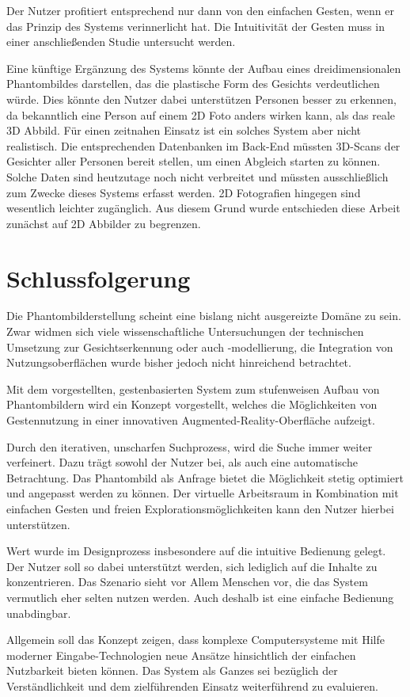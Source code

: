 \documentclass{sigchi-ext}
\begin{document}
Der Nutzer profitiert entsprechend nur dann von den einfachen Gesten, wenn er das Prinzip des Systems verinnerlicht hat. Die Intuitivität der Gesten muss in einer anschließenden Studie untersucht werden.

Eine künftige Ergänzung des Systems könnte der Aufbau eines dreidimensionalen Phantombildes 
darstellen, das die plastische Form des Gesichts verdeutlichen würde. Dies könnte den Nutzer dabei unterstützen Personen besser zu erkennen, da bekanntlich eine Person auf einem 2D Foto anders wirken kann, als das reale 3D Abbild. 
Für einen zeitnahen Einsatz ist ein solches System aber nicht realistisch. Die entsprechenden Datenbanken im Back-End müssten 3D-Scans der Gesichter aller Personen bereit stellen, um einen Abgleich starten zu können. Solche Daten sind heutzutage noch nicht verbreitet und müssten ausschließlich zum Zwecke dieses Systems erfasst werden. 2D Fotografien hingegen sind wesentlich leichter zugänglich. Aus diesem Grund wurde entschieden diese Arbeit zunächst auf 2D Abbilder zu begrenzen.

\section{Schlussfolgerung}
Die Phantombilderstellung scheint eine bislang nicht ausgereizte
Domäne zu sein. Zwar widmen sich viele wissenschaftliche
Untersuchungen der technischen Umsetzung zur Gesichtserkennung oder auch -modellierung, die Integration von Nutzungsoberflächen wurde bisher jedoch nicht hinreichend betrachtet.

Mit dem vorgestellten, gestenbasierten System zum stufenweisen Aufbau von
Phantombildern wird ein Konzept vorgestellt, welches die Möglichkeiten
von Gestennutzung in einer innovativen Augmented-Reality-Oberfläche
aufzeigt.

Durch den iterativen, unscharfen Suchprozess, wird die Suche immer weiter verfeinert.
Dazu trägt sowohl der Nutzer bei, als auch eine automatische Betrachtung. Das Phantombild als Anfrage bietet die Möglichkeit stetig optimiert und angepasst werden zu können. Der
virtuelle Arbeitsraum in Kombination mit einfachen Gesten und freien Explorationsmöglichkeiten kann den Nutzer hierbei unterstützen.

Wert wurde im Designprozess insbesondere auf die intuitive Bedienung gelegt. Der Nutzer soll so dabei unterstützt werden, sich lediglich auf die Inhalte zu konzentrieren. Das Szenario sieht vor Allem Menschen vor, die das System vermutlich eher selten nutzen werden. Auch deshalb ist eine einfache Bedienung unabdingbar.
 
Allgemein soll das Konzept zeigen, dass komplexe Computersysteme mit Hilfe moderner Eingabe-Technologien neue Ansätze hinsichtlich der einfachen Nutzbarkeit bieten können.
Das System als Ganzes sei bezüglich der Verständlichkeit und dem zielführenden Einsatz weiterführend zu evaluieren.

\balance{} 




\end{document}
